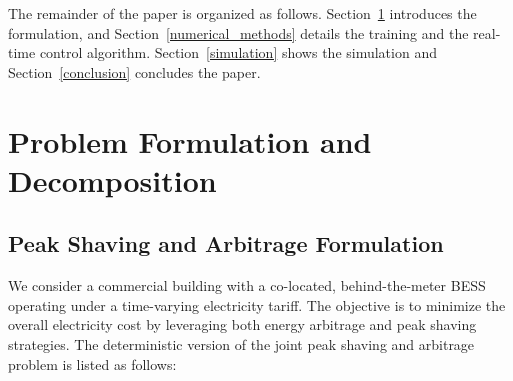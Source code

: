 \documentclass[conference]{IEEEtran}
\newcommand{\todo}[1]{\textcolor{red}{#1}} %
\begin{document}
The remainder of the paper is organized as follows. Section~\ref{formulation} introduces the formulation, and Section~\ref{numerical_methods} details the training and the real-time control algorithm. Section~\ref{simulation} shows the simulation and Section~\ref{conclusion} concludes the paper.

\section{Problem Formulation and Decomposition}\label{formulation}

\subsection{Peak Shaving and Arbitrage Formulation}




We consider a commercial building with a co-located, behind-the-meter BESS operating under a time-varying electricity tariff. The objective is to minimize the overall electricity cost by leveraging both energy arbitrage and peak shaving strategies. 
The deterministic version of the joint peak shaving and arbitrage problem is listed as follows:

\end{document}
